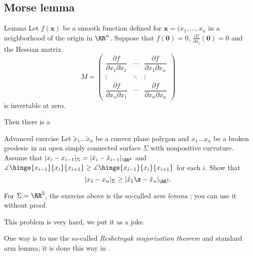 \subsection*{Morse lemma}

\begin{thm}{Lemma}\label{lem:morse}
Let $f(\bm{x})$ be a smooth function defined for $\bm{x}=(x_1,\dots,x_n$ in a neighborhood of the origin in $\RR^n$.
Suppose that $f(\bm{0})=0$, $\tfrac{\partial f}{\partial x_i}(\bm{0})=0$ and the Hessian matrix
\[M=\begin{pmatrix}
\dfrac{\partial f}{\partial x_1\partial x_1} & \cdots & \dfrac{\partial f}{\partial x_1\partial x_n}\\
\vdots & \ddots & \vdots\\
\dfrac{\partial f}{\partial x_n\partial x_1} & \cdots & \dfrac{\partial f}{\partial x_n\partial x_n} \end{pmatrix}\]
is invertable at zero.

Then there is a 
\end{thm}
















\begin{thm}{Advanced exercise}\label{ex:arm-lemma}
Let $\tilde x_1\dots\tilde x_n$ be a convex plane polygon and
$x_1\dots x_n$ be a broken geodesic in an open simply connected surface $\Sigma$ with nonpositive curvature.
Assume that
$|x_i-x_{i-1}|_\Sigma=|\tilde x_i-\tilde x_{i-1}|_{\RR^2}$ and
$\measuredangle\hinge{x_{i-1}}{x_i}{x_{i+1}}\ge \measuredangle\hinge{x_{i-1}}{x_i}{x_{i+1}}$
 for each $i$.
Show that \[|x_1-x_n|_\Sigma\ge |\tilde x_1\z-\tilde x_n|_{\RR^2}.\]
\end{thm}

For $\Sigma=\RR^2$, the exercise above is the so-called \emph{arm lemma} \cite{sabitov}; 
you can use it without proof.

This problem is very hard, we put it as a joke.

One way is to use the so-called \emph{Reshetnyak majorization theorem} and standard arm lemma; it is done this way in \cite{alexander-kapovitch-petrunin2027}.






















